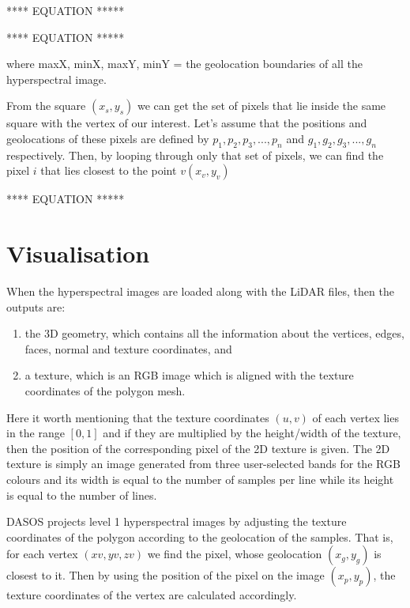 \documentclass{subfiles}
\begin{document}
	**** EQUATION *****
	
	**** EQUATION *****
	\par where maxX, minX, maxY, minY = the geolocation boundaries of all the hyperspectral image.
	
	\par From the square $(x_s,y_s)$ we can get the set of pixels that lie inside the same square with the vertex of our interest. Let’s assume that the positions and geolocations of these pixels are defined by $p_1	, p_2 , p_3, ... , p_n$ and $g_1, g_2, g_3 , ... , g_n$ respectively. Then, by looping through only that set of pixels, we can find the pixel $i$ that lies closest to the point $v(x_v , y_v)$
	
	**** EQUATION *****
	

	
	
		
\section{Visualisation}
	\par When the hyperspectral images are loaded along with the LiDAR files, then the outputs are: 	
	\begin{enumerate}
		\item the 3D geometry, which contains all the information about the vertices, edges, faces, normal and texture coordinates, and
		\item  a texture, which is an RGB image which is aligned with the texture coordinates of the polygon mesh.
	\end{enumerate}
	
	\par Here it worth mentioning that the texture coordinates $(u, v)$ of each vertex lies in the range $[0, 1]$ and if they are multiplied by the height/width of the texture, then the position of the corresponding pixel of the 2D texture is given. The 2D texture is simply an image generated from three user-selected bands for the RGB colours and its width is equal to the number of samples per line while its height is equal to the number of lines.
				
					
	\par DASOS projects level 1 hyperspectral images by adjusting the texture coordinates of the polygon according to the geolocation of the samples. That is, for each vertex $(xv, yv , zv)$ we find the pixel, whose geolocation $(x_g, y_g )$ is closest to it. Then by using the position of the pixel on the image $(x_p, y_p)$, the texture coordinates of the vertex are calculated accordingly.
				
\end{document}

